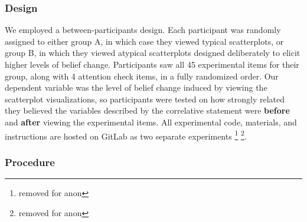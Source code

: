 \documentclass[manuscript,screen,review,anonymous]{acmart}
\begin{document}
\subsubsection{Design}\label{sec-design-main}

We employed a between-participants design. Each participant was randomly
assigned to either group A, in which case they viewed typical
scatterplots, or group B, in which they viewed atypical scatterplots
designed deliberately to elicit higher levels of belief change.
Participants saw all 45 experimental items for their group, along with 4
attention check items, in a fully randomized order. Our dependent
variable was the level of belief change induced by viewing the
scatterplot visualizations, so participants were tested on how strongly
related they believed the variables described by the correlative
statement were \textbf{before} and \textbf{after} viewing the
experimental items. All experimental code, materials, and instructions
are hosted on GitLab as two separate experiments \footnote{removed for
  anon} \footnote{removed for anon}.

\subsubsection{Procedure}\label{sec-procedure-main}
\end{document}
